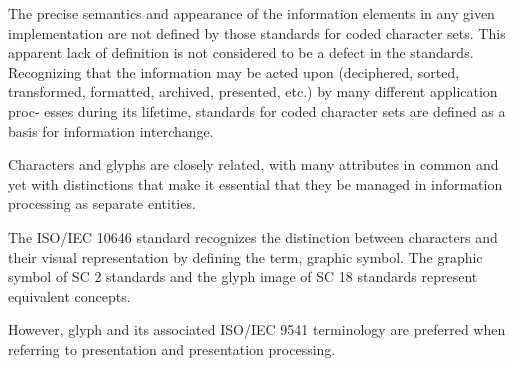 \documentclass{article} %
\begin{document}
The precise semantics 
and appearance of the information elements 
in any given implementation are not defined 
by those standards for coded character 
sets. This apparent lack of definition is not 
considered to be a defect in the standards. 
Recognizing that the information may be 
acted upon (deciphered, sorted, transformed, formatted, archived, presented, 
etc.) by many different application proc-
esses during its lifetime, standards for 
coded character sets are defined as a basis 
for information interchange.

 Characters and  glyphs are closely related, 
with many attributes in common and yet 
with distinctions that make it essential that 
they be managed in information processing 
as separate entities. 

The ISO/IEC 10646 
standard recognizes the distinction between characters and their visual representation 
by defining the term,  graphic symbol. The 
graphic symbol of SC 2 standards and the 
glyph image of SC 18 standards represent 
equivalent concepts. 

However, glyph and its 
associated ISO/IEC 9541 terminology are 
preferred when referring to presentation and 
presentation processing.  

\end{document}
